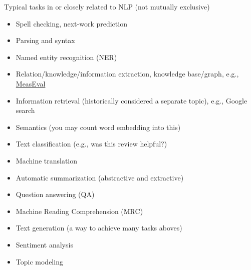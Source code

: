 \documentclass[11pt,handout]{beamer}
\begin{document}
\begin{frame}{Typical tasks in or closely related to NLP (not mutually exclusive)}


\begin{itemize}[<+->]
\item Spell checking, next-work prediction
\item Parsing and syntax
\item Named entity recognition (NER)
\item Relation/knowledge/information extraction, knowledge base/graph, e.g., \href{https://github.com/harperco/MeasEval}{MeasEval}
\item Information retrieval (historically considered a separate topic), e.g., Google search
\item Semantics (you may count word embedding into this)
\item Text classification  (e.g., was this review helpful?)
\item Machine translation
\item Automatic summarization (abstractive and extractive)
\item Question answering (QA)
\item Machine Reading Comprehension (MRC)
\item Text generation (a way to achieve many tasks aboves)
\item Sentiment analysis 
\item Topic modeling
\end{itemize}
\end{frame}
\end{document}
